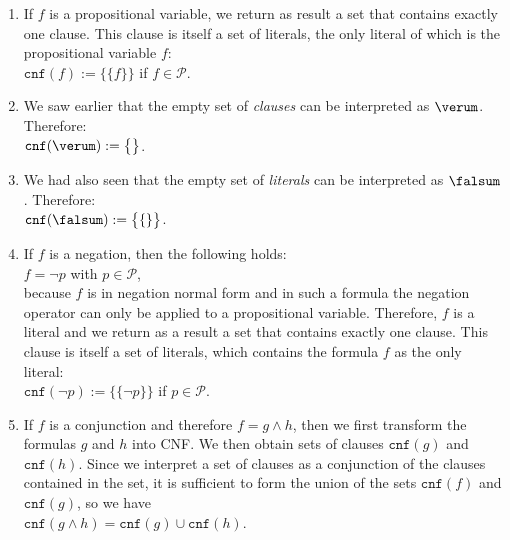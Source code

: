 \begin{enumerate}
\item If $f$ is a propositional variable, we return as result a set that contains exactly one
      clause.  This clause is itself a set of literals, the only literal of which is the
      propositional variable $f$:
      \\[0.2cm]
      \hspace*{1.3cm}
      $\texttt{cnf}(f) := \bigl\{\{f\}\bigr\}$ \quad if $f \in \mathcal{P}$.
\item We saw earlier that the empty set of \emph{clauses} can be interpreted as $\verum$.
      Therefore:
      \\[0.2cm]
      \hspace*{1.3cm}
      $\texttt{cnf}(\verum) := \bigl\{\bigr\}$.      
\item We had also seen that the empty set of \emph{literals} can be interpreted as $\falsum$.
      Therefore:
      \\[0.2cm]
      \hspace*{1.3cm}
      $\texttt{cnf}(\falsum) := \bigl\{\{\}\bigr\}$.      
\item If $f$ is a negation, then the following holds:
      \\[0.2cm]
      \hspace*{1.3cm}
      $f = \neg p$ \quad with $p \in \mathcal{P}$,
      \\[0.2cm]
      because $f$ is in negation normal form and in such a formula the negation operator can only be applied to
      a propositional variable.  Therefore, $f$ is a literal and we return as a result
      a set that contains exactly one clause.  This clause is itself a set of
      literals, which contains the formula $f$ as the only literal:
      \\[0.2cm]
      \hspace*{1.3cm}
      $\texttt{cnf}(\neg p) := \bigl\{\{\neg p\}\bigr\}$ \quad if $p \in \mathcal{P}$.
\item If $f$ is a conjunction and therefore $f = g \wedge h$, then we 
      first transform the formulas $g$ and $h$ into CNF.  We then obtain sets of clauses 
      $\texttt{cnf}(g)$ and $\texttt{cnf}(h)$.  Since we interpret a set of clauses as a conjunction of the clauses contained in the set,
      it is sufficient to form the union of the sets $\texttt{cnf}(f)$ and $\texttt{cnf}(g)$,
      so we have \\[0.2cm]
      \hspace*{1.3cm} $\texttt{cnf}(g \wedge h) = \texttt{cnf}(g) \cup \texttt{cnf}(h)$.

\end{enumerate}
